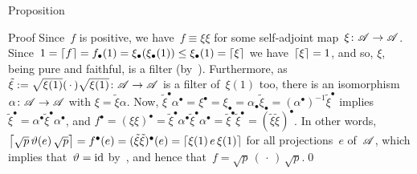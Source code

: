 \documentclass[a]{subfiles}
\begin{document}
\begin{parsec}
\begin{point}{Proposition}
\begin{point}{Proof}
Since~$f$ is positive,
we have~$f\equiv \xi \xi$ for some self-adjoint
map~$\xi\colon \mathscr{A}\to\mathscr{A}$.
Since~$1=\left\lceil f\right\rceil=f_\bullet(1)=
\xi_\bullet(\xi_\bullet(1))\leq \xi_\bullet(1)=\left\lceil\xi\right\rceil$
we have~$\left\lceil\xi\right\rceil=1$,
and so, $\xi$, being pure and faithful,
is a filter (by~).
Furthermore,
as~$\tilde\xi:=\sqrt{\xi(1)}(\,\cdot\,)\sqrt{\xi(1)}\colon \mathscr{A}\to\mathscr{A}$
is a filter of~$\xi(1)$ too,
there is an isomorphism~$\alpha\colon \mathscr{A}\to\mathscr{A}$
with $\xi=\tilde\xi\alpha$.
Now, $ {\tilde\xi}^\bullet \alpha^\bullet
={\xi}^\bullet={\xi}_\bullet
=\alpha_\bullet\tilde \xi_\bullet
= (\alpha^\bullet)^{-1}{\tilde\xi}^\bullet$
implies~${\tilde\xi}^\bullet = \alpha^\bullet 
{\tilde \xi}^\bullet \alpha^\bullet$,
and 
$f^\bullet= (\xi\xi)^\bullet
= {\tilde \xi}^\bullet\alpha^\bullet{\tilde \xi}^\bullet\alpha^\bullet
={\tilde \xi}^\bullet{\tilde \xi}^\bullet=(\tilde \xi\tilde \xi)^\bullet$.
In other words,
$\left\lceil\sqrt{p}\,\vartheta(e)\,\sqrt{p}\right\rceil
=f^\bullet(e)=(\tilde\xi\tilde\xi)^\bullet(e)
= \left\lceil\xi(1)\,e\,\xi(1)\right\rceil$
for all projections~$e$ of~$\mathscr{A}$,
which implies that~$\vartheta=\operatorname{id}$
by~,
and hence that~$f=\sqrt{p}\,(\,\cdot\,)\,\sqrt{p}$.\qed
\end{point}
\end{point}
\end{parsec}
\end{document}
